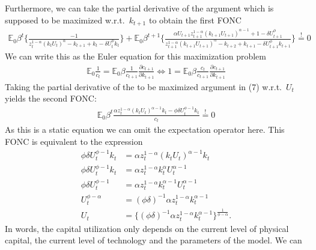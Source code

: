 \documentclass[a4paper]{article}
\theoremstyle{definition}
\begin{document}
Furthermore, we can take the partial derivative of the argument which is supposed to be maximized w.r.t.\ $k_{t+1}$ to obtain the first FONC
	\begin{align*}
	\mathbb E_0 \beta^t \Big\{ \frac{-1}{z_t^{1-\alpha}(k_t U_t)^\alpha - k_{t+1} + k_t - \delta U_t^\phi k_t} \Big\} + \mathbb E_0 \beta^{t+1} \Big\{ \frac{\alpha U_{t+1} z_{t+1}^{1-\alpha}(k_{t+1}U_{t+1})^{\alpha-1} + 1 - \delta U_{t+1}^\phi}{z_{t+1}^{1-\alpha}(k_{t+1}U_{t+1})^\alpha-k_{t+2}+k_{t+1}-\delta U_{t+1}^\phi k_{t+1}} \Big\} \overset{!}{=} 0 
	\end{align*}
We can write this as the Euler equation for this maximization problem
	\begin{align*}
	\mathbb E_0 \frac{1}{c_t} = \mathbb E_0 \beta \frac{1}{c_{t+1}} \frac{\partial c_{t+1}}{\partial k_{t+1}} \Leftrightarrow 1 = \mathbb E_0 \beta \frac{c_{t}}{c_{t+1}} \frac{\partial c_{t+1}}{\partial k_{t+1}}
	\end{align*}
Taking the partial derivative of the to be maximized argument in (7) w.r.t.\ $U_t$ yields the second FONC:
	\begin{align*}
	\mathbb E_0 \beta^t \frac{\alpha z_t^{1-\alpha}(k_t U_t)^{\alpha-1}k_t- \phi \delta U_t^{\phi-1}k_t}{c_t} \overset{!}{=} 0
	\end{align*}
As this is a static equation we can omit the expectation operator here. This FONC is equivalent to the expression
	\begin{align*}
	\phi \delta U_t^{\phi-1}k_t 	&= \alpha z_t^{1-\alpha}(k_t U_t)^{\alpha-1}k_t \\
	\phi \delta U_t^{\phi-1}k_t 	&= \alpha z_t^{1-\alpha} k_t^{\alpha}U_t^{\alpha-1} \\
	\phi \delta U_t^{\phi-1} 		&= \alpha z_t^{1-\alpha} k_t^{\alpha-1} U_t^{\alpha-1} \\
	U_t^{\phi-\alpha} 				&= (\phi \delta)^{-1}  \alpha z_t^{1-\alpha} k_t^{\alpha-1} \\
	U_t 								&= \Big\{ (\phi \delta)^{-1}  \alpha z_t^{1-\alpha} k_t^{\alpha-1} \Big\}^{\frac{1}{\phi-\alpha}}.
	\end{align*}
In words, the capital utilization only depends on the current level of physical capital, the current level of technology and the parameters of the model. We can 
\end{document}
